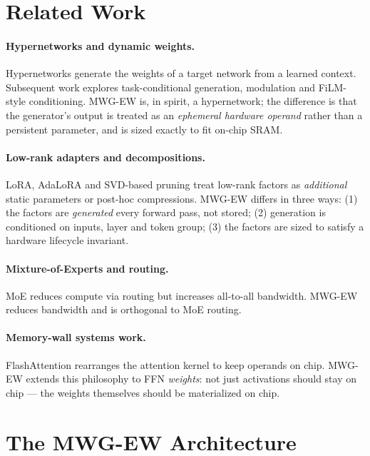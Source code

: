 \documentclass[11pt]{article}
\theoremstyle{definition}
\begin{document}
\section{Related Work}
\label{sec:related}

\paragraph{Hypernetworks and dynamic weights.} Hypernetworks \cite{ha2017hypernetworks} generate the weights of a target network from a learned context. Subsequent work explores task-conditional generation, modulation and FiLM-style conditioning. MWG-EW is, in spirit, a hypernetwork; the difference is that the generator's output is treated as an \emph{ephemeral hardware operand} rather than a persistent parameter, and is sized exactly to fit on-chip SRAM.

\paragraph{Low-rank adapters and decompositions.} LoRA, AdaLoRA and SVD-based pruning treat low-rank factors as \emph{additional} static parameters or post-hoc compressions. MWG-EW differs in three ways: (1) the factors are \emph{generated} every forward pass, not stored; (2) generation is conditioned on inputs, layer and token group; (3) the factors are sized to satisfy a hardware lifecycle invariant.

\paragraph{Mixture-of-Experts and routing.} MoE reduces compute via routing but increases all-to-all bandwidth. MWG-EW reduces bandwidth and is orthogonal to MoE routing.

\paragraph{Memory-wall systems work.} FlashAttention rearranges the attention kernel to keep operands on chip. MWG-EW extends this philosophy to FFN \emph{weights}: not just activations should stay on chip --- the weights themselves should be materialized on chip.

\section{The MWG-EW Architecture}
\label{sec:arch}
\end{document}
